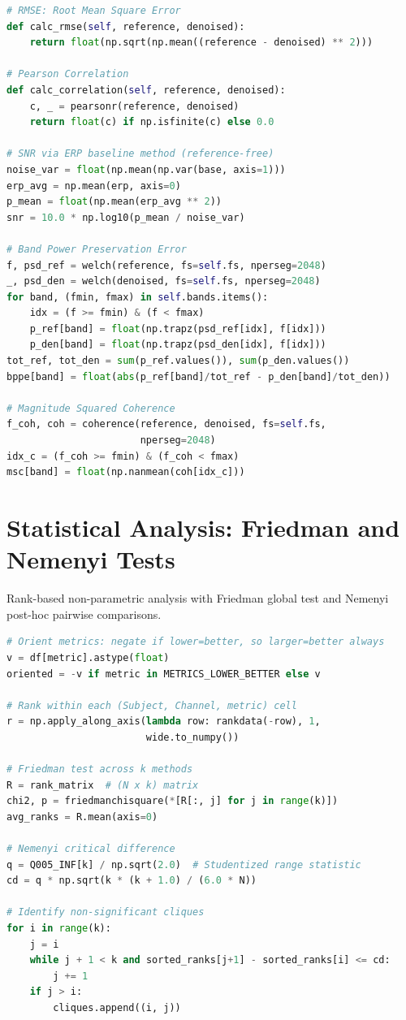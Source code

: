 \documentclass[MScCS,12pt,oneside,final]{uccthesis}
\begin{document}
\begin{lstlisting}[language=Python, caption={Core metric calculations}, label={lst:metrics}]
# RMSE: Root Mean Square Error
def calc_rmse(self, reference, denoised):
    return float(np.sqrt(np.mean((reference - denoised) ** 2)))

# Pearson Correlation
def calc_correlation(self, reference, denoised):
    c, _ = pearsonr(reference, denoised)
    return float(c) if np.isfinite(c) else 0.0

# SNR via ERP baseline method (reference-free)
noise_var = float(np.mean(np.var(base, axis=1)))
erp_avg = np.mean(erp, axis=0)
p_mean = float(np.mean(erp_avg ** 2))
snr = 10.0 * np.log10(p_mean / noise_var)

# Band Power Preservation Error
f, psd_ref = welch(reference, fs=self.fs, nperseg=2048)
_, psd_den = welch(denoised, fs=self.fs, nperseg=2048)
for band, (fmin, fmax) in self.bands.items():
    idx = (f >= fmin) & (f < fmax)
    p_ref[band] = float(np.trapz(psd_ref[idx], f[idx]))
    p_den[band] = float(np.trapz(psd_den[idx], f[idx]))
tot_ref, tot_den = sum(p_ref.values()), sum(p_den.values())
bppe[band] = float(abs(p_ref[band]/tot_ref - p_den[band]/tot_den))

# Magnitude Squared Coherence
f_coh, coh = coherence(reference, denoised, fs=self.fs, 
                       nperseg=2048)
idx_c = (f_coh >= fmin) & (f_coh < fmax)
msc[band] = float(np.nanmean(coh[idx_c]))
\end{lstlisting}

\section{Statistical Analysis: Friedman and Nemenyi Tests}
\label{app:code_stats}

Rank-based non-parametric analysis with Friedman global test and Nemenyi post-hoc pairwise comparisons.

\begin{lstlisting}[language=Python, caption={Friedman test and Nemenyi critical difference}, label={lst:stats}]
# Orient metrics: negate if lower=better, so larger=better always
v = df[metric].astype(float)
oriented = -v if metric in METRICS_LOWER_BETTER else v

# Rank within each (Subject, Channel, metric) cell
r = np.apply_along_axis(lambda row: rankdata(-row), 1, 
                        wide.to_numpy())

# Friedman test across k methods
R = rank_matrix  # (N x k) matrix
chi2, p = friedmanchisquare(*[R[:, j] for j in range(k)])
avg_ranks = R.mean(axis=0)

# Nemenyi critical difference
q = Q005_INF[k] / np.sqrt(2.0)  # Studentized range statistic
cd = q * np.sqrt(k * (k + 1.0) / (6.0 * N))

# Identify non-significant cliques
for i in range(k):
    j = i
    while j + 1 < k and sorted_ranks[j+1] - sorted_ranks[i] <= cd:
        j += 1
    if j > i:
        cliques.append((i, j))
\end{lstlisting}
\end{document}
